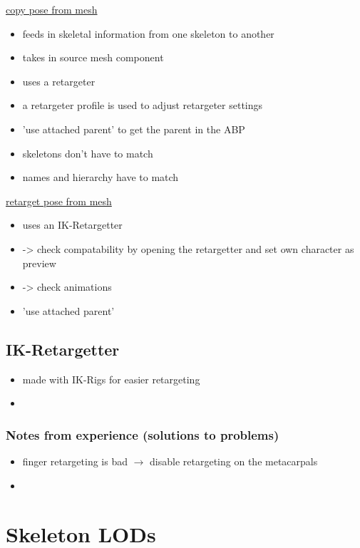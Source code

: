     
    \uline{copy pose from mesh}  
    \begin{itemize}
        \item feeds in skeletal information from one skeleton to another
        \item takes in source mesh component
        \item uses a retargeter
        \item a retargeter profile is used to adjust retargeter settings
        \item 'use attached parent' to get the parent in the ABP
        \item skeletons don't have to match
        \item names and hierarchy have to match
    \end{itemize}
	
    \uline{retarget pose from mesh}
    \begin{itemize}
        \item uses an IK-Retargetter
        \item -> check compatability by opening the retargetter and set own character as preview
        \item -> check animations
        \item 'use attached parent'
    \end{itemize}
    
    \subsection{IK-Retargetter}
        \begin{itemize}
            \item made with IK-Rigs for easier retargeting
            \item 
        \end{itemize}
        \subsubsection{Notes from experience (solutions to problems) }
            \begin{itemize}
                \item finger retargeting is bad $\rightarrow$ disable  retargeting on the metacarpals
                \item 
            \end{itemize}


    \section{Skeleton LODs}
        

